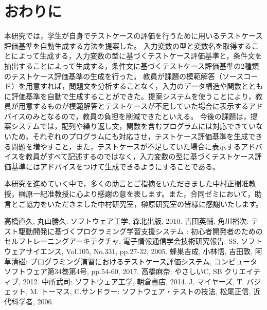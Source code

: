 \documentclass{tpu-sotu}
\begin{document}
\chapter{おわりに}
本研究では，学生が自身でテストケースの評価を行うために用いるテストケース評価基準を自動生成する方法を提案した。
入力変数の型と変数名を取得することによって生成する，入力変数の型に基づくテストケース評価基準と，条件文を抽出することによって生成する，条件文に基づくテストケース評価基準の2種類のテストケース評価基準の生成を行った。
教員が課題の模範解答（ソースコード）を用意すれば，問題文を分析することなく，入力のデータ構造や関数とともに評価基準を自動で生成することができた。提案システムを使うことにより，教員が用意するものが模範解答とテストケースが不足していた場合に表示するアドバイスのみとなるので，教員の負担を削減できたといえる。
今後の課題は，提案システムでは，配列や繰り返し文，関数を含むプログラムには対応できていないため，それぞれのプログラムにも対応させ，テストケース評価基準を生成できる問題を増やすこと，また，テストケースが不足していた場合に表示するアドバイスを教員がすべて記述するのではなく，入力変数の型に基づくテストケース評価基準にはアドバイスをつけて生成できるようにすることである。


\acknowledgements
本研究を進めていく中で，多くの助言とご指摘をいただきました中村正樹准教授，榊原一紀准教授に心より感謝の意を表します。また，合同ゼミにおいて，助言とご協力をいただきました中村研究室，榊原研究室の皆様に感謝いたします。
\begin{thebibliography}{3}
    高橋直久, 丸山勝久: ソフトウェア工学, 森北出版, 2010.
    吉田英輔, 角川裕次: テスト駆動開発に基づくプログラミング学習支援システム : 初心者開発者のためのセルフトレーニングアーキテクチャ, 電子情報通信学会技術研究報告. SS, ソフトウェアサイエンス, Vol.105, No.331, pp.27-32, 2005.
    蜂巣吉成, 小林悟, 吉田敦, 阿草清磁: プログラミング演習におけるテストケース評価システム, コンピュータソフトウェア第34巻第4号, pp.54-60, 2017.
    高橋麻奈: やさしいC, SB クリエイティブ, 2012.
    中所武司: ソフトウェア工学, 朝倉書店, 2014.
    J. マイヤーズ, T. バジェット, M. トーマス, C.サンドラー: ソフトウェア・テストの技法, 松尾正信, 近代科学者, 2006.
\end{thebibliography}
\end{document}
